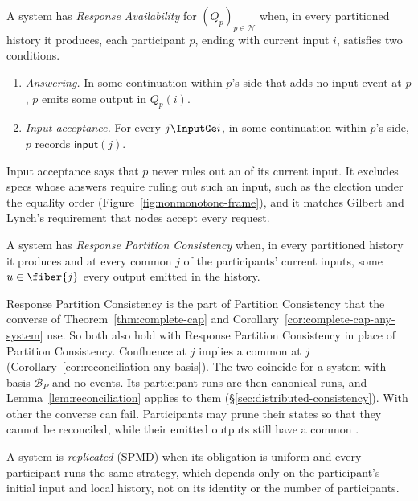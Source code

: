 \begin{definition}
\label{def:response-availability}
A system has \emph{Response Availability} for $(Q_p)_{p\in\mathcal N}$ when, in every
partitioned history it produces, each participant $p$, ending with current
input $i$, satisfies two conditions.
\begin{enumerate}
  \item \emph{Answering.}  In some continuation within $p$'s side that
        adds no input event at $p$, $p$ emits some output in $Q_p(i)$.
  \item \emph{Input acceptance.}  For every $j\InputGe i$, in some
        continuation within $p$'s side, $p$ records $\mathsf{input}(j)$.
\end{enumerate}
\end{definition}

Input acceptance says that $p$ never rules out an \indesc of its current
input.  It excludes specs whose answers require ruling out such an input, such
as the election under the equality order (Figure~\ref{fig:nonmonotone-frame}),
and it matches Gilbert and Lynch's requirement that nodes accept every
request.

\begin{definition}
\label{def:response-partition-consistency}
A system has \emph{Response Partition Consistency} when, in every partitioned
history it produces and at every common \indesc $j$ of the participants'
current inputs, some $u\in\fiber{j}$ \outrel every output emitted in the
history.
\end{definition}

Response Partition Consistency is the part of Partition Consistency that the
converse of Theorem~\ref{thm:complete-cap} and
Corollary~\ref{cor:complete-cap-any-system} use.  So both also hold with
Response Partition Consistency in place of Partition Consistency.  Confluence
at $j$ implies a common \outnoun at $j$
(Corollary~\ref{cor:reconciliation-any-basis}).  The two coincide for a system
with basis $\mathcal B_P$ and no \commitment events.  Its participant runs are
then canonical runs, and Lemma~\ref{lem:reconciliation} applies to them
(\S\ref{sec:distributed-consistency}).  With other \commitments the converse
can fail.  Participants may prune their states so that they cannot be
reconciled, while their emitted outputs still have a common \outnoun.

A system is \emph{replicated} (SPMD) when its obligation is uniform and every
participant runs the same strategy, which depends only on the participant's
initial input and local history, not on its identity or the number of
participants.

